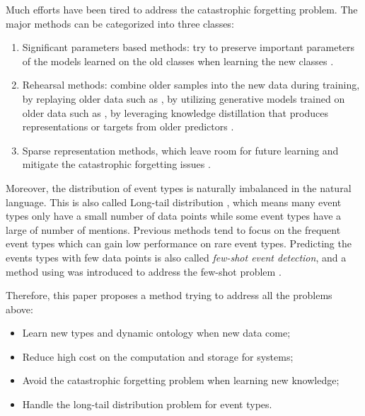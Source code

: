 Much efforts have been tired to address the catastrophic forgetting problem. The major methods can be categorized into three classes: 
\begin{enumerate}
  \item Significant parameters based methods: try to preserve important parameters of the models learned on the old classes when learning the new classes \citep{kirkpatrick2017overcoming, aljundi2018memory}.
  \item Rehearsal methods: combine older samples into the new data during training, by replaying older data such as \citet{rebuffi2017icarl, hou2019learning}, by utilizing generative models trained on older data such as \citet{shin2017continual}, by leveraging knowledge distillation that produces representations or targets from older predictors \citep{li2017learning, cao2020incremental}.
  \item Sparse representation methods, which leave room for future learning and mitigate the catastrophic forgetting issues \citep{liu2019utility, aljundi2018selfless}.
\end{enumerate}

Moreover, the distribution of event types is naturally imbalanced in the natural language. This is also called Long-tail distribution \citep{yu2021lifelong}, which means many event types only have a small number of data points while some event types have a large of number of mentions. Previous methods \citep{nguyen2016two, cao2020incremental} tend to focus on the frequent event types which can gain low performance on rare event types. Predicting the events types with few data points is also called \textit{few-shot event detection}, and a method using  was introduced to address the few-shot problem \citep{chen2021honey}.

Therefore, this paper proposes a method trying to address all the problems above:
\begin{itemize}[noitemsep]
  \item Learn new types and dynamic ontology when new data come;
  \item Reduce high cost on the computation and storage for systems;
  \item Avoid the catastrophic forgetting problem when learning new knowledge;
  \item Handle the long-tail distribution problem for event types.
\end{itemize}

